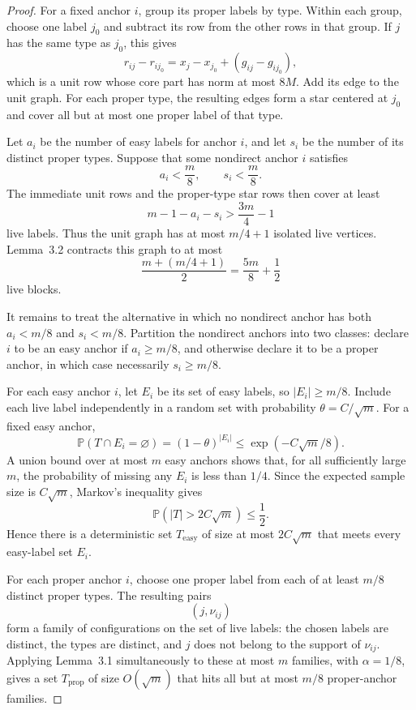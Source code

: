 \documentclass[10pt]{article}
\theoremstyle{definition}
\begin{document}
\begin{proof}
For a fixed anchor $i$, group its proper labels by type.  Within each group,
choose one label $j_0$ and subtract its row from the other rows in that
group.  If $j$ has the same type as $j_0$, this gives
\[
    r_{ij}-r_{ij_0}
      =x_j-x_{j_0}+(g_{ij}-g_{ij_0}),
\]
which is a unit row whose core part has norm at most $8M$.  Add its edge to
the unit graph.  For each proper type, the resulting edges form a star
centered at $j_0$ and cover all but at most one proper label of that type.

Let $a_i$ be the number of easy labels for anchor $i$, and let $s_i$ be the
number of its distinct proper types.  Suppose that some nondirect anchor $i$
satisfies
\[
    a_i<\frac m8,
    \qquad
    s_i<\frac m8.
\]
The immediate unit rows and the proper-type star rows then cover at least
\[
    m-1-a_i-s_i>\frac{3m}{4}-1
\]
live labels.  Thus the unit graph has at most $m/4+1$ isolated live
vertices.  Lemma~3.2 contracts this graph to at most
\[
    \frac{m+(m/4+1)}{2}=\frac{5m}{8}+\frac12
\]
live blocks.

It remains to treat the alternative in which no nondirect anchor has both
$a_i<m/8$ and $s_i<m/8$.  Partition the nondirect anchors into two classes:
declare $i$ to be an easy anchor if $a_i\ge m/8$, and otherwise declare it
to be a proper anchor, in which case necessarily $s_i\ge m/8$.

For each easy anchor $i$, let $E_i$ be its set of easy labels, so
$|E_i|\ge m/8$.  Include each live label independently in a random set with
probability $\theta=C/\sqrt m$.  For a fixed easy anchor,
\[
    \mathbb P(T\cap E_i=\varnothing)
      =(1-\theta)^{|E_i|}
      \le \exp(-C\sqrt m/8).
\]
A union bound over at most $m$ easy anchors shows that, for all sufficiently
large $m$, the probability of missing any $E_i$ is less than $1/4$.  Since
the expected sample size is $C\sqrt m$, Markov's inequality gives
\[
    \mathbb P(|T|>2C\sqrt m)\le\frac12.
\]
Hence there is a deterministic set $T_{\mathrm{easy}}$ of size at most
$2C\sqrt m$ that meets every easy-label set $E_i$.

For each proper anchor $i$, choose one proper label from each of at least
$m/8$ distinct proper types.  The resulting pairs
\[
    (j,\nu_{ij})
\]
form a family of configurations on the set of live labels: the chosen labels
are distinct, the types are distinct, and $j$ does not belong to the support
of $\nu_{ij}$.  Applying Lemma~3.1 simultaneously to these at most $m$
families, with $\alpha=1/8$, gives a set $T_{\mathrm{prop}}$ of size
$O(\sqrt m)$ that hits all but at most $m/8$ proper-anchor families.


\end{proof}
\end{document}

